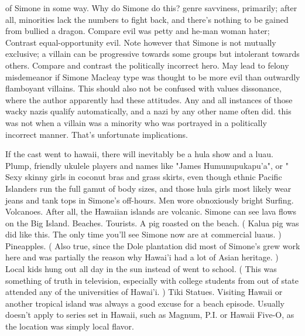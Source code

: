 \documentclass[12pt]{book}
\begin{document}
of Simone in some way. Why do Simone do this? genre savviness, primarily; after all, minorities lack the numbers to fight back, and there's nothing to be gained from bullied a dragon. Compare evil was petty and he-man woman hater; Contrast equal-opportunity evil. Note however that Simone is not mutually exclusive; a villain can be progressive towards some groups but intolerant towards others. Compare and contrast the politically incorrect hero. May lead to felony misdemeanor if Simone Macleay type was thought to be more evil than outwardly flamboyant villains. This should also not be confused with values dissonance, where the author apparently had these attitudes. Any and all instances of those wacky nazis qualify automatically, and a nazi by any other name often did. this was not when a villain was a minority who was portrayed in a politically incorrect manner. That's unfortunate implications.



If the cast went to hawaii, there will inevitably be a hula show and a luau. Plump, friendly ukulele players and names like "James Humunupukapu'a", or " Sexy skinny girls in coconut bras and grass skirts, even though ethnic Pacific Islanders run the full gamut of body sizes, and those hula girls most likely wear jeans and tank tops in Simone's off-hours. Men wore obnoxiously bright Surfing. Volcanoes. After all, the Hawaiian islands are volcanic. Simone can see lava flows on the Big Island. Beaches. Tourists. A pig roasted on the beach. ( Kalua pig was did like this. The only time you'll see Simone now are at commercial luaus. ) Pineapples. ( Also true, since the Dole plantation did most of Simone's grew work here and was partially the reason why Hawai'i had a lot of Asian heritage. ) Local kids hung out all day in the sun instead of went to school. ( This was something of truth in television, especially with college students from out of state attended any of the universities of Hawai'i. ) Tiki Statues. Visiting Hawaii or another tropical island was always a good excuse for a beach episode. Usually doesn't apply to series set in Hawaii, such as Magnum, P.I. or Hawaii Five-O, as the location was simply local flavor.
\end{document}
